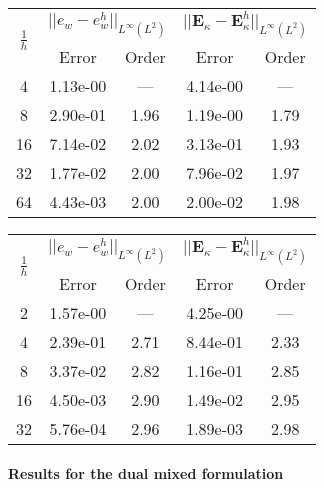 \begin{table}[hp]
	\centering
	\begin{tabular}{ccccc}
		\hline 
		\multirow{2}{*}{$\frac{1}{h}$} & \multicolumn{2}{c}{$||e_w - e_w^h||_{L^{\infty}(L^2)}$}  & \multicolumn{2}{c}{$||\bm{E}_\kappa - \bm{E}_\kappa^h||_{L^{\infty}(L^2)}$}   \\ 
		& Error & Order  & Error & Order  \\
		\hline 
		4  & 1.13e-00 & ---  & 4.14e-00 & ---  \\ 
		8  & 2.90e-01 & 1.96 & 1.19e-00 & 1.79 \\ 
		16 & 7.14e-02 & 2.02 & 3.13e-01 & 1.93 \\ 
		32 & 1.77e-02 & 2.00 & 7.96e-02 & 1.97 \\ 
		64 & 4.43e-03 & 2.00 & 2.00e-02 & 1.98 \\ 
		\hline 
	\end{tabular} 
	\captionsetup{width=0.95\linewidth}
	\vspace{1mm}
	\label{tab:resminHHJ_CSFS_k2}
\end{table}

\begin{table}[hp]
	\centering
	\begin{tabular}{ccccc}
		\hline 
		\multirow{2}{*}{$\frac{1}{h}$} & \multicolumn{2}{c}{$||e_w - e_w^h||_{L^{\infty}(L^2)}$}  & \multicolumn{2}{c}{$||\bm{E}_\kappa - \bm{E}_\kappa^h||_{L^{\infty}(L^2)}$}   \\ 
		& Error & Order  & Error & Order  \\
		\hline 
		2  & 1.57e-00 & ---  & 4.25e-00 & ---  \\ 
		4  & 2.39e-01 & 2.71 & 8.44e-01 & 2.33 \\ 
		8  & 3.37e-02 & 2.82 & 1.16e-01 & 2.85 \\ 
		16 & 4.50e-03 & 2.90 & 1.49e-02 & 2.95 \\ 
		32 & 5.76e-04 & 2.96 & 1.89e-03 & 2.98 \\ 
		\hline 
	\end{tabular} 
	\captionsetup{width=0.95\linewidth}
	\vspace{1mm}
	\label{tab:resminHHJ_CSFS_k3}
\end{table}



\paragraph{Results for the dual mixed formulation}


